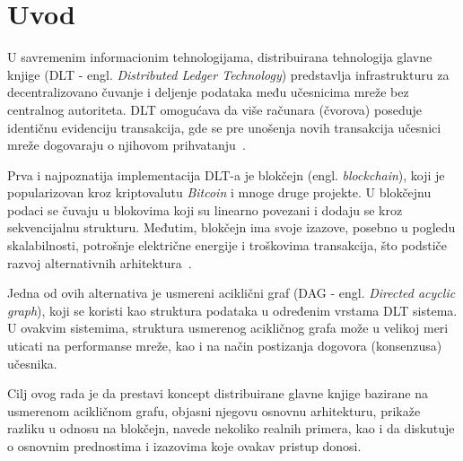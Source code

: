 \section{Uvod}

U savremenim informacionim tehnologijama, distribuirana tehnologija glavne knjige (DLT - engl. \textit{Distributed Ledger Technology}) predstavlja infrastrukturu za decentralizovano čuvanje i deljenje podataka među učesnicima mreže bez centralnog autoriteta. DLT omogućava da više računara (čvorova) poseduje identičnu evidenciju transakcija, gde se pre unošenja novih transakcija učesnici mreže dogovaraju o njihovom prihvatanju~\cite{blockchain and DLT}.

Prva i najpoznatija implementacija DLT-a je blokčejn (engl. \textit{blockchain}), koji je popularizovan kroz kriptovalutu \textit{Bitcoin} i mnoge druge projekte. U blokčejnu podaci se čuvaju u blokovima koji su linearno povezani i dodaju se kroz sekvencijalnu strukturu. Međutim, blokčejn ima svoje izazove, posebno u pogledu skalabilnosti, potrošnje električne energije i troškovima transakcija, što podstiče razvoj alternativnih arhitektura~\cite{blockchain and DLT}.

Jedna od ovih alternativa je usmereni aciklični graf (DAG - engl. \textit{Directed acyclic graph}), koji se koristi kao struktura podataka u određenim vrstama DLT sistema. U ovakvim sistemima, struktura usmerenog acikličnog grafa može u velikoj meri uticati na performanse mreže, kao i na način postizanja dogovora (konsenzusa) učesnika.

Cilj ovog rada je da prestavi koncept distribuirane glavne knjige bazirane na usmerenom acikličnom grafu, objasni njegovu osnovnu arhitekturu, prikaže razliku u odnosu na blokčejn, navede nekoliko realnih primera, kao i da diskutuje o osnovnim prednostima i izazovima koje ovakav pristup donosi.

